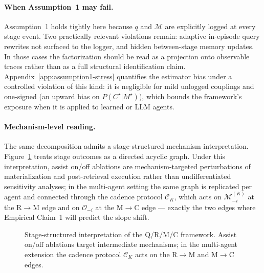 \documentclass{article}
\begin{document}
\paragraph{When Assumption~1 may fail.}
Assumption~1 holds tightly here because $q$ and $\mathcal{M}$ are
explicitly logged at every stage event. Two practically relevant
violations remain: adaptive in-episode query rewrites not surfaced to
the logger, and hidden between-stage memory updates. In those cases
the factorization should be read as a projection onto observable
traces rather than as a full structural identification claim.
Appendix~\ref{app:assumption1-stress} quantifies the estimator bias
under a controlled violation of this kind: it is negligible for mild
unlogged couplings and one-signed (an upward bias on
$P(C^\star|M^\star)$), which bounds the framework's exposure when it is
applied to learned or LLM agents.

\paragraph{Mechanism-level reading.}
The same decomposition admits a stage-structured mechanism
interpretation. Figure~\ref{fig:causal} treats stage outcomes as a
directed acyclic graph. Under this interpretation, assist on/off
ablations are mechanism-targeted perturbations of materialization and
post-retrieval execution rather than undifferentiated sensitivity
analyses; in the multi-agent setting the same graph is replicated per
agent and connected through the cadence protocol $\mathcal{C}_K$,
which acts on $\mathcal{M}_{-i}^{(K)}$ at the R$\to$M edge and on
$\mathcal{O}_{-i}$ at the M$\to$C edge --- exactly the two edges where
Empirical Claim~1 will predict the slope shift.

\begin{figure}[t]
  \centering
  \caption{Stage-structured interpretation of the Q/R/M/C framework. Assist on/off ablations target intermediate mechanisms; in the multi-agent extension the cadence protocol $\mathcal{C}_K$ acts on the R$\to$M and M$\to$C edges.}
  \label{fig:causal}
\end{figure}
\end{document}
